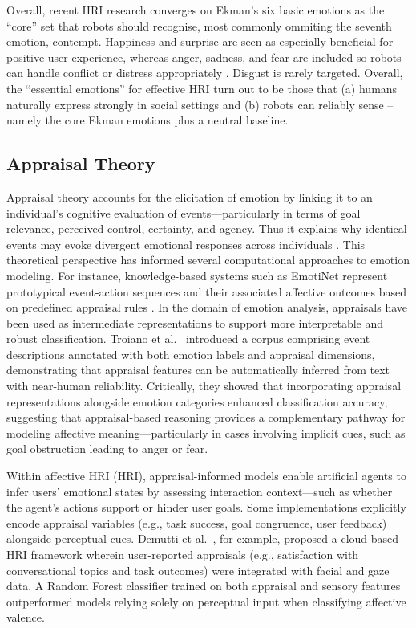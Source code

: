 Overall, recent HRI research converges on Ekman's six basic emotions as the ``core'' set that robots should recognise, most commonly ommiting the seventh emotion, contempt. Happiness and surprise are seen as especially beneficial for positive user experience, whereas anger, sadness, and fear are included so robots can handle conflict or distress appropriately \cite{Chuah2021-zw}. Disgust is rarely targeted. Overall, the ``essential emotions'' for effective HRI turn out to be those that (a) humans naturally express strongly in social settings and (b) robots can reliably sense – namely the core Ekman emotions plus a neutral baseline.

\subsection{Appraisal Theory}

Appraisal theory accounts for the elicitation of emotion by linking it to an individual's cognitive evaluation of events—particularly in terms of goal relevance, perceived control, certainty, and agency. Thus it explains why identical events may evoke divergent emotional responses across individuals \cite{Suhaila_2021-ez}. This theoretical perspective has informed several computational approaches to emotion modeling. For instance, knowledge-based systems such as EmotiNet represent prototypical event-action sequences and their associated affective outcomes based on predefined appraisal rules \cite{Balahur2011-mb}. In the domain of emotion analysis, appraisals have been used as intermediate representations to support more interpretable and robust classification. Troiano et al.\ \cite{Troiano2023-if} introduced a corpus comprising event descriptions annotated with both emotion labels and appraisal dimensions, demonstrating that appraisal features can be automatically inferred from text with near-human reliability. Critically, they showed that incorporating appraisal representations alongside emotion categories enhanced classification accuracy, suggesting that appraisal-based reasoning provides a complementary pathway for modeling affective meaning—particularly in cases involving implicit cues, such as goal obstruction leading to anger or fear.

Within affective HRI (HRI), appraisal-informed models enable artificial agents to infer users' emotional states by assessing interaction context—such as whether the agent's actions support or hinder user goals. Some implementations explicitly encode appraisal variables (e.g., task success, goal congruence, user feedback) alongside perceptual cues. Demutti et al.\ \cite{Demutti2022-vz}, for example, proposed a cloud-based HRI framework wherein user-reported appraisals (e.g., satisfaction with conversational topics and task outcomes) were integrated with facial and gaze data. A Random Forest classifier trained on both appraisal and sensory features outperformed models relying solely on perceptual input when classifying affective valence.


